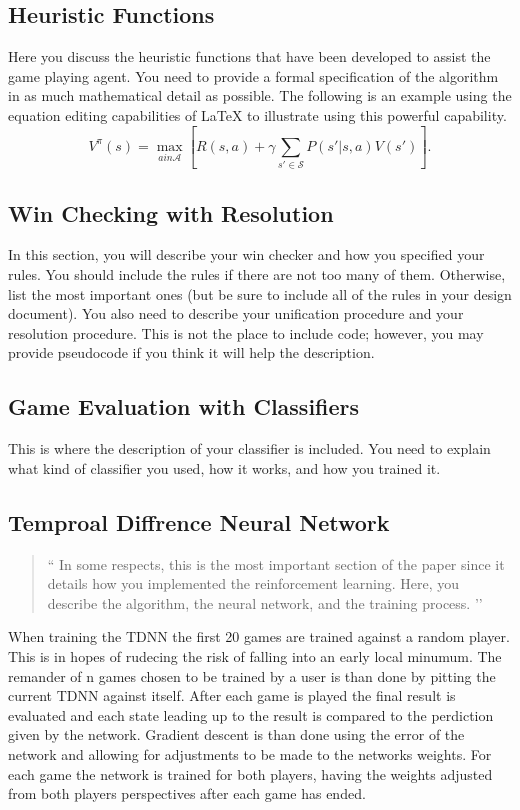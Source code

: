 \documentclass[12pt,letterpaper]{article}
\begin{document}
\subsection{Heuristic Functions}
Here you discuss the heuristic functions that have been developed to assist the
game playing agent. You need to provide a formal specification of the algorithm
in as much mathematical detail as possible. The following is an example using
the equation editing capabilities of \LaTeX{} to illustrate using this powerful capability.
\[
V^\pi(s)=\max_{a in \mathcal{A}} \left[ R(s,a) + \gamma \sum_{s' \in \mathcal{S}} P(s'|s,a) V(s') \right].
\]

\subsection{Win Checking with Resolution}
In this section, you will describe your win checker and how you specified your rules. 
You should include the rules if there are not too many of them. Otherwise, list the most important
ones (but be sure to include all of the rules in your design document). You also need to describe 
your unification procedure and your resolution procedure. This is not the place to include code; 
however, you may provide pseudocode if you think it will help the description.

\subsection{Game Evaluation with Classifiers}
This is where the description of your classifier is included. You need to explain what kind of
classifier you used, how it works, and how you trained it.

\subsection{Temproal Diffrence Neural Network}
\begin{quote}
`` 
In some respects, this is the most important section of the paper since it details how
you implemented the reinforcement learning. Here, you describe the algorithm, the
neural network, and the training process.
’’
\end{quote}



When training the TDNN the first 20 games are trained against a random player. This is in hopes of rudecing the risk of falling into an early local minumum. The remander of n games chosen to be trained by a user is than done by pitting the current TDNN against itself. After each game is played the final result is evaluated and each state leading up to the result is compared to the perdiction given by the network. Gradient descent is than done using the error of the network and allowing for adjustments to be made to the networks weights. For each game the network is trained for both players, having the weights adjusted from both players perspectives after each game has ended.
\end{document}
